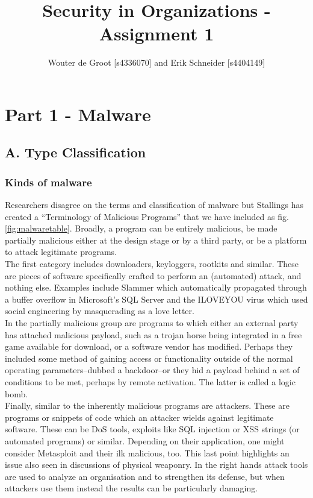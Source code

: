 \documentclass[a4paper]{llncs}
\title{Security in Organizations - Assignment 1}
\author{Wouter de Groot [s4336070] and Erik Schneider [s4404149]}
\institute{Technische Universiteit Eindhoven\\
Eindhoven, The Netherlands\\
October 6, 2014}
\begin{document}
	
\maketitle

\section{Part 1 - Malware}
\subsection{A. Type Classification}
\subsubsection{Kinds of malware}
Researchers disagree on the terms and classification of malware but Stallings  \cite{stallings2007network} has created a “Terminology of Malicious Programs” that we have included as fig. \ref{fig:malwaretable}. Broadly, a program can be entirely malicious, be made partially malicious either at the design stage or by a third party, or be a platform to attack legitimate programs.\\

The first category includes downloaders, keyloggers, rootkits and similar. These are pieces of software specifically crafted to perform an (automated) attack, and nothing else. Examples include Slammer which automatically propagated through a buffer overflow in Microsoft’s SQL Server and the ILOVEYOU virus which used social engineering by masquerading as a love letter.\\

In the partially malicious group are programs to which either an external party has attached malicious payload, such as a trojan horse being integrated in a free game available for download, or a software vendor has modified. Perhaps they included some method of gaining access or functionality outside of the normal operating parameters--dubbed a backdoor--or they hid a payload behind a set of conditions to be met, perhaps by remote activation. The latter is called a logic bomb.\\

Finally, similar to the inherently malicious programs are attackers. These are programs or snippets of code which an attacker wields against legitimate software. These can be DoS tools, exploits like SQL injection or XSS strings (or automated programs) or similar. Depending on their application, one might consider Metasploit and their ilk malicious, too. This last point highlights an issue also seen in discussions of physical weaponry. In the right hands attack tools are used to analyze an organisation and to strengthen its defense, but when attackers use them instead the results can be particularly damaging.\\
\end{document}

